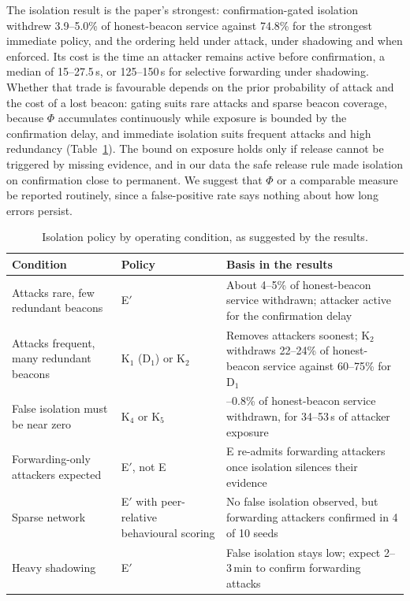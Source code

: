 \documentclass[pdflatex,sn-mathphys-num]{sn-jnl}%
\theoremstyle{thmstyleone}%
\theoremstyle{thmstyletwo}%
\theoremstyle{thmstylethree}%
\begin{document}
The isolation result is the paper's strongest: confirmation-gated isolation
withdrew 3.9--5.0\% of honest-beacon service against 74.8\% for the strongest
immediate policy, and the ordering held under attack, under shadowing and when
enforced. Its cost is the time an attacker remains active before
confirmation, a median of 15--27.5\,s, or 125--150\,s for selective forwarding
under shadowing. Whether that trade is favourable depends on the prior
probability of attack and the cost of a lost beacon: gating suits rare attacks
and sparse beacon coverage, because $\Phi$ accumulates continuously while
exposure is bounded by the confirmation delay, and immediate isolation suits
frequent attacks and high redundancy (Table~\ref{tab:guide}). The bound on
exposure holds only if release cannot be triggered by missing evidence, and in
our data the safe release rule made isolation on confirmation close to
permanent. We suggest that $\Phi$ or a comparable measure be reported
routinely, since a false-positive rate says nothing about how long errors
persist.

\begin{table}[!t]
\caption{Isolation policy by operating condition, as suggested by the results.}
\label{tab:guide}
\centering
\footnotesize
\begin{tabular}{@{}>{\raggedright\arraybackslash}p{4.4cm}>{\raggedright\arraybackslash}p{2.2cm}>{\raggedright\arraybackslash}p{5.4cm}@{}}
\toprule
Condition & Policy & Basis in the results \\
\midrule
Attacks rare, few redundant beacons & E$'$ & About 4--5\% of honest-beacon service withdrawn; attacker active for the confirmation delay \\
Attacks frequent, many redundant beacons & K$_1$ (D$_1$) or K$_2$ & Removes attackers soonest; K$_2$ withdraws 22--24\% of honest-beacon service against 60--75\% for D$_1$ \\
False isolation must be near zero & K$_4$ or K$_5$ & 0--0.8\% of honest-beacon service withdrawn, for 34--53\,s of attacker exposure \\
Forwarding-only attackers expected & E$'$, not E & E re-admits forwarding attackers once isolation silences their evidence \\
Sparse network & E$'$ with peer-relative behavioural scoring & No false isolation observed, but forwarding attackers confirmed in 4 of 10 seeds \\
Heavy shadowing & E$'$ & False isolation stays low; expect 2--3\,min to confirm forwarding attacks \\
\bottomrule
\end{tabular}
\end{table}
\end{document}
